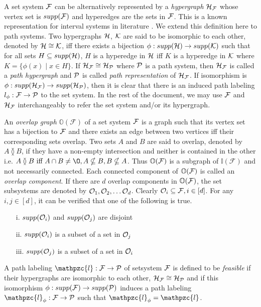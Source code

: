 \documentclass{fsttcs}
\def\cF{{\cal F}}
\def\cH{{\cal H}}
\def\cK{{\cal K}}
\def\cO{{\cal O}}
\def\cP{{\cal P}}
\def\F{{\mathcal F}}
\def\H{{\mathcal H}}
\def\bI{\mathbb I}
\def\bO{\mathbb O}
\def\cl{\mathpzc{l}}
\def\overlap{\between}
\begin{document}
\noindent
A set system $\cF$ can be alternatively represented by a {\em
  hypergraph} $\H_\cF$ whose vertex set is $supp(\cF)$ and hyperedges
are the sets in $\cF$. This is a known representation for interval
systems in literature \cite{bls99}.  We extend this definition here to
path systems.  Two hypergraphs $\cH$, $\cK$ are said to be isomorphic
to each other, denoted by $\cH \cong \cK$, iff there exists a
bijection $\phi: supp(\cH) \rightarrow supp(\cK)$ such that for all
sets $H \subseteq supp(\cH)$, $H$ is a hyperedge in $\cH$ iff $K$ is a
hyperedge in $\cK$ where $K = \{\phi(x) \mid x \in H\}$.  If $\H_\cF
\cong \H_\cP$ where $\cP$ is a path system, then $\H_\cF$ is
called a {\em path hypergraph}
and $\cP$ is called {\em path representation} of $\H_\cF$. If
isomorphism is $\phi: supp(\H_\cF) \rightarrow supp(\H_\cP)$, then it
is clear that there is an induced path labeling $l_\phi: \cF
\rightarrow \cP$ to the
set system. In the rest of the document, we may use $\cF$ and
$\cH_\cF$ interchangeably to refer the set system and/or its hypergraph.

\noindent
An {\em overlap graph} $\bO(\F)$ of a set system $\cF$ is a graph such
that its vertex set has a bijection to $\cF$ and there exists an edge
between two vertices iff their corresponding sets overlap. Two sets
$A$ and $B$ are said to overlap, denoted by $A \overlap B$, if they
have a non-empty intersection and neither is contained in the other
i.e. $A \overlap B \text{ iff } A \cap B \ne \O, A \nsubseteq B, B
\nsubseteq A$. Thus $\bO(\cF)$ is a subgraph of $\bI(\F)$ and not
necessarily connected. Each connected component of $\bO(\cF)$ is
called an {\em overlap component}. If there are $d$ overlap components
in $\bO(\cF)$, the set subsystems are denoted by $\cO_1, \cO_2, \ldots
\cO_d$. Clearly $\cO_i \subseteq \F, i \in [d]$. For any $i, j \in [d]$,
it can be verified that one of the following is true.
\begin{enumerate}
\item[i.] $supp(\cO_i)$ and $supp(\cO_j)$ are disjoint
\item[ii.] $supp(\cO_i)$ is a subset of a set in $\cO_j$
\item[iii.] $supp(\cO_j)$ is a subset of a set in $\cO_i$
\end{enumerate}
 
\noindent
A path labeling $\cl: \cF \rightarrow \cP$ of setsystem $\cF$ is defined to be {\em
  feasible} if their hypergraphs are isomorphic to each other,
$\cH_\cF \cong \cH_\cP$ and if this isomorphism $\phi: supp(\cF)
\rightarrow supp(\cP)$ induces a path labeling $\cl_\phi: \cF
\rightarrow \cP$ such that $\cl_\phi = \cl$. 
\end{document}
